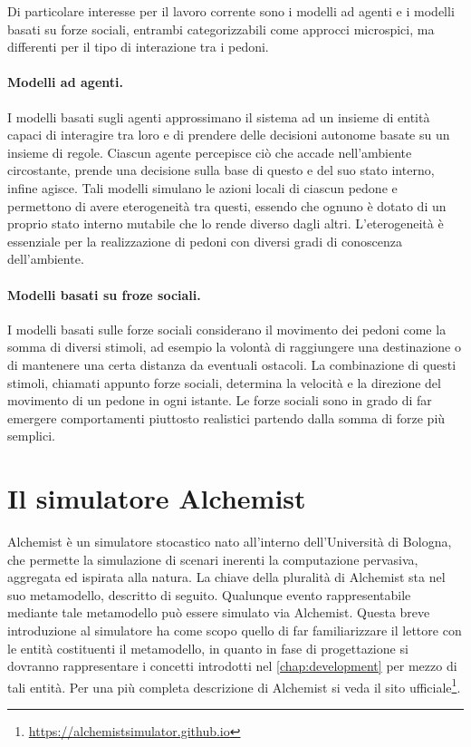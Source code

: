 \documentclass[12pt,a4paper,openright,oneside]{book}
\begin{document}
Di particolare interesse per il lavoro corrente sono i modelli ad agenti e i modelli basati su forze sociali, entrambi categorizzabili come approcci microspici, ma differenti per il tipo di interazione tra i pedoni.
\paragraph{Modelli ad agenti.} I modelli basati sugli agenti approssimano il sistema ad un insieme di entità capaci di interagire tra loro e di prendere delle decisioni autonome basate su un insieme di regole. Ciascun agente percepisce ciò che accade nell’ambiente circostante, prende una decisione sulla base di questo e del suo stato interno, infine agisce. Tali modelli simulano le azioni locali di ciascun pedone e permettono di avere eterogeneità tra questi, essendo che ognuno è dotato di un proprio stato interno mutabile che lo rende diverso dagli altri. L’eterogeneità è essenziale per la realizzazione di pedoni con diversi gradi di conoscenza dell’ambiente. 
\paragraph{Modelli basati su froze sociali.} I modelli basati sulle forze sociali \cite{HelbingSocialForce1998} considerano il movimento dei pedoni come la somma di diversi stimoli, ad esempio la volontà di raggiungere una destinazione o di mantenere una certa distanza da eventuali ostacoli. La combinazione di questi stimoli, chiamati appunto forze sociali, determina la velocità e la direzione del movimento di un pedone in ogni istante. Le forze sociali sono in grado di far emergere comportamenti piuttosto realistici partendo dalla somma di forze più semplici.

\section{Il simulatore Alchemist}
Alchemist \cite{alchemist-jos2013} è un simulatore stocastico nato all’interno dell’Università di Bologna, che permette la simulazione di scenari inerenti la computazione pervasiva, aggregata ed ispirata alla natura. La chiave della pluralità di Alchemist sta nel suo metamodello, descritto di seguito. Qualunque evento rappresentabile mediante tale metamodello può essere simulato via Alchemist. Questa breve introduzione al simulatore ha come scopo quello di far familiarizzare il lettore con le entità costituenti il metamodello, in quanto in fase di progettazione si dovranno rappresentare i concetti introdotti nel \cref{chap:development} per mezzo di tali entità. Per una più completa descrizione di Alchemist si veda il sito ufficiale\footnote{\url{https://alchemistsimulator.github.io}}.
\end{document}
